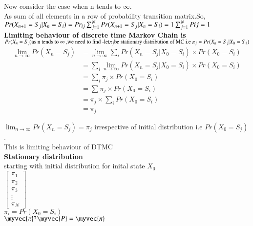\documentclass[journel,12pt,twocoloums]{IEEEtran}
\begin{document}
Now consider the case when n tends to $\infty$.\\
As sum of all elements in a row of probability transition matrix.So,\\
\begin{math}
Pr(X_{n+1}=S_j|X_n=S_i)=Pr_{ij}\\

\sum_{j=1}^{N} Pr(X_{n+1}=S_j|X_n=S_i)=1\\

\sum_{j=1}^{N} P{ij}=1\\
\end{math}
\\
\textbf{Limiting behaviour of discrete time Markov Chain is}\\

\begin{math}
Pr(X_n=S_j) \text{as n tends to $\infty$ ,we need to find -}\\
\text{let}  \pi_j \text{be stationary distribution of MC i.e }\\
\pi_j =Pr(X_n=S_j|X_0=S_1)
\end{math}
\begin{align}
\lim_{n \to \infty}Pr(X_n=S_j) 
 &= \lim_{n \to \infty} \sum_{i} Pr(X_n=S_j |X_0=S_i) \times Pr(X_0=S_i)\\
 &=\sum_{i} \lim_{n \to \infty} Pr(X_n=S_j |X_0=S_i) \times Pr(X_0=S_i)\\
 &= \sum_{i} \pi_j \times Pr(X_0=S_i)\\
 &=\sum \pi_j \times Pr(X_0=S_i)\\
 &=\pi_j \times \sum_{i} Pr(X_0=S_i)\\
 &=\pi_j
\end{align}

$\lim_{n \to \infty}Pr(X_n=S_j) =\pi_j$ irrespective of initial distribution i.e $Pr(X_0=S_j)$. \\
This is limiting behaviour of DTMC\\

\textbf{Stationary distribution}\\
starting with initial distribution for inital state $X_0$\\
\begin{math}
\left[
\begin{array}{c}
    \pi_1\\
    \pi_2\\
    \pi_3\\
    \vdots\\
    \pi_N
\end{array}\right]
\end{math}
\\
$\pi_i=Pr(X_0=S_i)$\\
$\myvec{\pi}^\intercal \myvec{P}=\myvec{\pi}$
\end{document}
